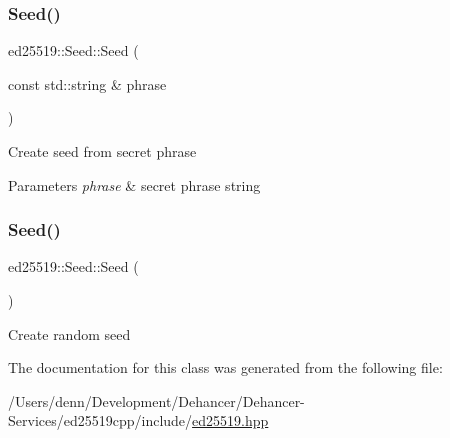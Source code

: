 \subsubsection{\texorpdfstring{Seed()}{Seed()}\hspace{0.1cm}{\footnotesize\ttfamily [1/2]}}
{\footnotesize\ttfamily ed25519\+::\+Seed\+::\+Seed (\begin{DoxyParamCaption}\item[{const std\+::string \&}]{phrase }\end{DoxyParamCaption})}

Create seed from secret phrase 
\begin{DoxyParams}{Parameters}
{\em phrase} & secret phrase string \\
\hline
\end{DoxyParams}
\mbox{\label{classed25519_1_1_seed_ade6584a80efeb3ad8b89929a9684b30f}} 
\subsubsection{\texorpdfstring{Seed()}{Seed()}\hspace{0.1cm}{\footnotesize\ttfamily [2/2]}}
{\footnotesize\ttfamily ed25519\+::\+Seed\+::\+Seed (\begin{DoxyParamCaption}{ }\end{DoxyParamCaption})}

Create random seed 

The documentation for this class was generated from the following file\+:\begin{DoxyCompactItemize}
\item 
/\+Users/denn/\+Development/\+Dehancer/\+Dehancer-\/\+Services/ed25519cpp/include/\mbox{\hyperlink{ed25519_8hpp}{ed25519.\+hpp}}\end{DoxyCompactItemize}
